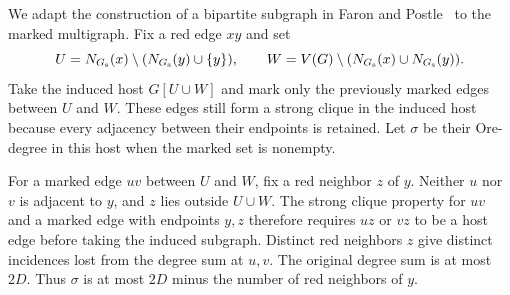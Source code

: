 \documentclass[preprint,11pt,numbers]{elsarticle-arxiv}
\numberwithin{equation}{section}
\theoremstyle{definition}
\begin{document}
We adapt the construction of a bipartite subgraph in Faron and
Postle~\cite{FaronPostle2019} to the marked
multigraph. Fix a red edge $xy$ and set
\[
 U=N_{G_{\rm s}}(x)\setminus(N_{G_{\rm s}}(y)\cup\{y\}),
 \qquad
 W=V(G)\setminus(N_{G_{\rm s}}(x)\cup N_{G_{\rm s}}(y)).
\]
Take the induced host $G[U\cup W]$ and mark only the previously
marked edges between $U$ and $W$. These edges still form a strong
clique in the induced host because every adjacency between their
endpoints is retained. Let $\sigma$ be their Ore-degree in this
host when the marked set is nonempty.

For a marked edge $uv$ between $U$ and $W$, fix a red neighbor
$z$ of $y$. Neither $u$ nor $v$ is adjacent to $y$, and $z$ lies
outside $U\cup W$. The strong clique property for $uv$ and a marked
edge with endpoints $y,z$ therefore requires $uz$ or $vz$ to be
a host edge before taking the induced subgraph. Distinct red
neighbors $z$ give distinct incidences lost from the degree sum
at $u,v$. The original degree sum is at most $2D$. Thus $\sigma$
is at most $2D$ minus the number of red neighbors of $y$.
\end{document}
